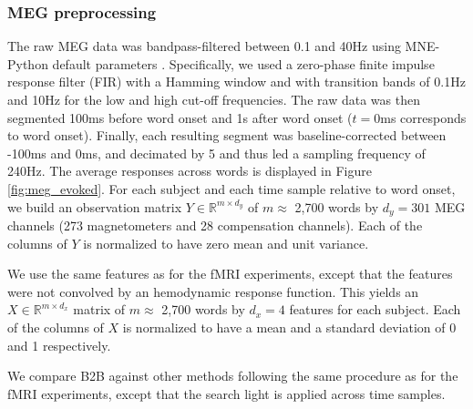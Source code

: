 
\subsubsection{MEG preprocessing}

The raw MEG data was bandpass-filtered between 0.1 and 40Hz using MNE-Python
default parameters \citep{gramfort2013meg, gramfort2014mne}. Specifically, we
used a zero-phase finite impulse
response filter (FIR) with a Hamming window and with transition bands of 0.1Hz
and 10Hz for the low and high cut-off frequencies. The raw data was then
segmented 100ms before word onset and 1s after
word onset ($t=0$ms corresponds to word onset). Finally, each resulting
segment was baseline-corrected between -100ms and 0ms, and decimated by 5 and
thus led a sampling frequency of 240Hz. The average responses across words is
displayed in Figure \ref{fig:meg_evoked}.
For each subject and each time sample relative to word onset, we
build an observation matrix $Y \in \mathbb{R}^{m \times d_y}$ of $m\approx$ 2,700 words
by $d_y=301$ MEG channels (273 magnetometers and 28 compensation channels). Each
of the columns of $Y$ is normalized to have zero mean and unit variance.

We use the same features as for the fMRI experiments, except that the features
were not convolved by an hemodynamic response function. This yields an $X \in \mathbb{R}^{m \times d_x}$
matrix of $m\approx$ 2,700 words by $d_x=4$ features for each subject. Each of
the columns of $X$ is normalized to have a mean and a standard deviation of 0
and 1 respectively.

We compare B2B against other methods following the same procedure as for the
fMRI experiments, except that the search light is applied across time samples.



